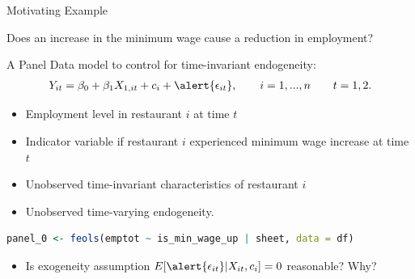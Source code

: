 \documentclass[9pt,aspectratio=169]{beamer}
\begin{document}
\begin{frame}[fragile]{Motivating Example}
\linespread{1.3}\selectfont %
    \begin{center}
        Does an increase in the minimum wage \alert{cause} a reduction in employment?
    \end{center}
    A Panel Data model to control for time-invariant endogeneity:
    \begin{align*}
       Y_{it} = \beta_0 + \beta_1 X_{1,it} + c_i + \alert{\epsilon_{it}}, \quad \quad i = 1, ... , n \quad \quad t = 1, 2. 
    \end{align*}
    \vspace{-0.6cm}
    \begin{itemize}
        \item [$Y_{it}$] Employment level in restaurant $i$ at time $t$
        \item [$X_{it}$] Indicator variable if restaurant $i$ experienced minimum wage increase at time $t$  \pause
        \item [$c_i$] Unobserved time-invariant characteristics of restaurant $i$ 
        \item [$\alert{\epsilon_{it}}$] Unobserved time-varying endogeneity.
    \end{itemize}
    \vspace{0.3cm}
    \begin{lstlisting}[language=R]
        panel_0 <- feols(emptot ~ is_min_wage_up | sheet, data = df)
    \end{lstlisting}
    \begin{itemize}
        \item[$\rightarrow$] Is exogeneity assumption $E[\alert{\epsilon_{it}}|X_{it}, c_i] = 0$ reasonable? Why?
    \end{itemize}
\end{frame}
\end{document}
